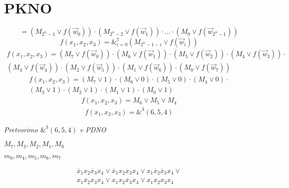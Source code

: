\documentclass[a4paper]{report}
\begin{document}
\section{PKNO}
\begin{equation}
=\left(M_{2^n-1} \vee f(\vec{w}_0)\right) \cdot \left(M_{2^n-2} \vee f(\vec{w}_1)\right) \cdot ... \cdot \left(M_0 \vee f(\vec{w}_{2^n-1})\right)
\end{equation}
\begin{equation}
    f(x_1,x_2,x_3)=\&_{i=0}^{7}\left( M_{2^{n}-1-i} \vee f(\vec{w}_i)\right)
\end{equation}
\begin{align}
    f(x_1,x_2,x_3)=\left( M_{7} \vee f(\vec{w}_0)\right) \cdot \left( M_{6} \vee f(\vec{w}_1)\right) \cdot
    \left( M_{5} \vee f(\vec{w}_2)\right) \cdot
    \left( M_{4} \vee f(\vec{w}_3)\right) \cdot\\
    \left( M_{3} \vee f(\vec{w}_4)\right) \cdot
    \left( M_{2} \vee f(\vec{w}_5)\right) \cdot
    \left( M_{1} \vee f(\vec{w}_6)\right) \cdot
    \left( M_{0} \vee f(\vec{w}_7)\right) 
\end{align}
\begin{align}
    f(x_1,x_2,x_3)=\left( M_{7} \vee 1\right) \cdot \left( M_{6} \vee 0\right) \cdot
    \left( M_{5} \vee 0\right) \cdot
    \left( M_{4} \vee 0\right) \cdot\\
    \left( M_{3} \vee 1\right) \cdot
    \left( M_{2} \vee 1\right) \cdot
    \left( M_{1} \vee 1\right) \cdot
    \left( M_{0} \vee 1\right) 
\end{align}
\begin{align}
    f(x_1,x_2,x_3)= M_{6} \vee M_5 \vee M_4 
\end{align}
\begin{align}
    f(x_1,x_2,x_3)= \&^3(6,5,4)
\end{align}

\textit{Pretvorimo $\&^3(6,5,4)$ v PDNO}

$M_7, M_3, M_2, M_1, M_0$

$m_0, m_4, m_5, m_6, m_7$

\begin{align*}
\overline x_1 x_2 \overline x_3 x_4 \vee \overline x_1 x_2 x_3 x_4 \vee  x_1 \overline x_2 \overline x_3 x_4 \vee\\ x_1 \overline x_2  x_3 x_4 \vee x_1  x_2 \overline x_3 x_4 \vee x_1 x_2  x_3 x_4
\end{align*}
\end{document}
